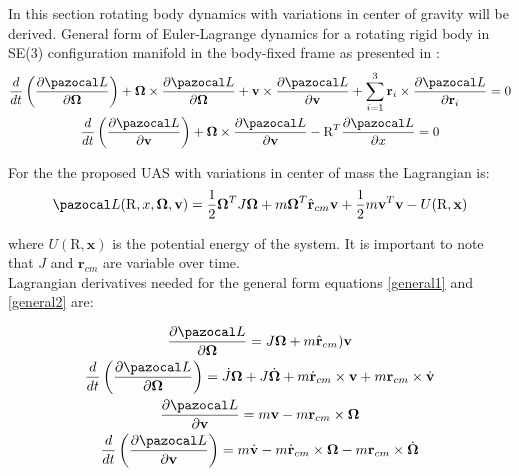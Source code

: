 In this section rotating body dynamics with variations in center of gravity will be derived.
General form of Euler-Lagrange dynamics for a rotating rigid body in SE(3) configuration manifold in the body-fixed frame as presented in \cite{LeeModel}:
\begin{gather}
	\frac{d}{dt} \left( \frac{\partial \La}{\partial \mb{\Omega}} \right)
	+ \mb{\Omega} \times \frac{\partial \La}{\partial \mb{\Omega}} 
	+ \textbf{v} \times \frac{\partial \La}{\partial \textbf{v}} 
	+ \sum_{i=1}^{3} \textbf{r}_i \times \frac{\partial \La}{\partial \textbf{r}_i} = 0 \label{general1}\\
	\frac{d}{dt} \left( \frac{\partial \La}{\partial \textbf{v}} \right)
	+ \mb{\Omega} \times \frac{\partial \La}{\partial \textbf{v}} 
	- \text{R}^T \frac{\partial \La}{\partial x} = 0 \label{general2}
\end{gather}

For the the proposed UAS with variations in center of mass the Lagrangian is:
\begin{equation}
	\La(\text{R},x,\mb{\Omega},\textbf{v}) = \frac{1}{2}\mb{\Omega}^TJ\mb{\Omega} + m \mb{\Omega}^T \hat{\textbf{r}}_{cm}\textbf{v} + \frac{1}{2}m\textbf{v}^T\textbf{v} - U(\text{R},\textbf{x})
\end{equation}

\noindent where $U(\text{R}, \textbf{x})$ is the potential energy of the system. It is important to note that $J$ and $\textbf{r}_{cm}$ are variable over time. \\
Lagrangian derivatives needed for the general form equations \ref{general1} and \ref{general2} are:

\begin{gather}
	\frac{\partial \La}{\partial \mb{\Omega}} = J\mb{\Omega} + m \hat{\textbf{r}}_{cm})\textbf{v} \label{d1}\\ 
	\frac{d}{dt} \left( \frac{\partial \La}{\partial \mb{\Omega}} \right) = \dot{J} \mb{\Omega} + J \dot{\mb{\Omega}} + m \dot{\textbf{r}}_{cm} \times \textbf{v} + m \textbf{r}_{cm} \times \dot{\textbf{v}} \label{d2}\\ 
	\frac{\partial \La}{\partial \textbf{v}} = m\textbf{v} - m\textbf{r}_{cm} \times \mb{\Omega} \label{d3}\\ 
	\frac{d}{dt} \left( \frac{\partial \La}{\partial \textbf{v}} \right) = m\dot{\textbf{v}} - m\dot{\textbf{r}}_{cm} \times \mb{\Omega} - m \textbf{r}_{cm} \times \dot{\mb{\Omega}} \label{d4}
\end{gather}

